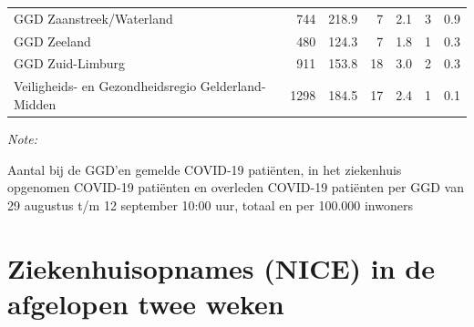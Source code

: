 \documentclass[
  english,
  man,floatsintext]{apa6}
\begin{document}
\begin{table}
\begin{threeparttable}
\begin{tabular}{lrrrrrr}
GGD Zaanstreek/Waterland & 744 & 218.9 & 7 & 2.1 & 3 & 0.9\\
GGD Zeeland & 480 & 124.3 & 7 & 1.8 & 1 & 0.3\\
GGD Zuid-Limburg & 911 & 153.8 & 18 & 3.0 & 2 & 0.3\\
Veiligheids- en Gezondheidsregio Gelderland-Midden & 1298 & 184.5 & 17 & 2.4 & 1 & 0.1\\
\bottomrule
\end{tabular}
\begin{tablenotes}
\item \textit{Note: } 
\item Aantal bij de GGD’en gemelde COVID-19 patiënten, in het ziekenhuis opgenomen COVID-19 patiënten en overleden COVID-19 patiënten per GGD van 29 augustus t/m 12 september 10:00 uur, totaal en per 100.000 inwoners
\end{tablenotes}
\end{threeparttable}
\endgroup{}
\end{table}

\newpage

\hypertarget{ziekenhuisopnames-nice-in-de-afgelopen-twee-weken}{%
\section{Ziekenhuisopnames (NICE) in de afgelopen twee weken}\label{ziekenhuisopnames-nice-in-de-afgelopen-twee-weken}}
\end{document}
